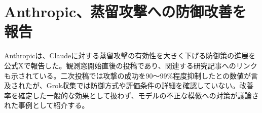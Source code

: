\section{Anthropic、蒸留攻撃への防御改善を報告}
Anthropicは、Claudeに対する蒸留攻撃の有効性を大きく下げる防御策の進展を公式Xで報告した。観測窓開始直後の投稿であり、関連する研究記事へのリンクも示されている。二次投稿では攻撃の成功を90～99\%程度抑制したとの数値が言及されたが、Grok収集では防御方式や評価条件の詳細を確認していない。改善率を確定した一般的な効果として扱わず、モデルの不正な模倣への対策が議論された事例として紹介する。
